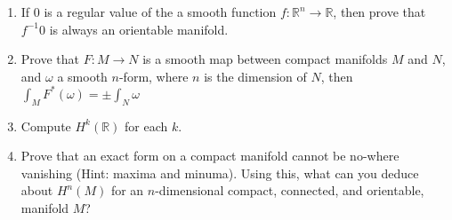 \begin{enumerate}
\item If 0 is a regular value of the a smooth function $f : \mathbb{R}^n \to \mathbb{R}$, then prove that $f^{-1}{0}$ is always an orientable manifold.
  \item Prove that $F : M \to N$ is a smooth map between compact manifolds $M$ and $N$, and $\omega$ a smooth $n$-form, where $n$ is the dimension of $N$, then $\int_M F^*(\omega) = \pm \int_N \omega$
    \item Compute $H^k(\mathbb{R})$ for each $k$.
      \item Prove that an exact form on a compact manifold cannot be no-where vanishing (Hint: maxima and minuma). Using this, what can you deduce about $H^n(M)$ for an $n$-dimensional compact, connected, and orientable, manifold $M$?
\end{enumerate}
